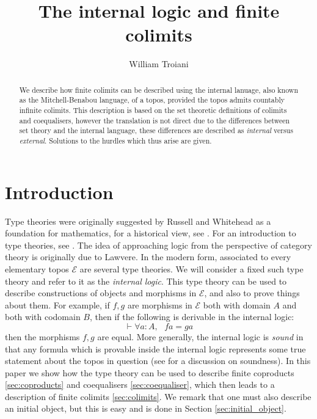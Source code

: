 \documentclass{tac}
\author{William Troiani}
\title{The internal logic and finite colimits}
\newcommand{\call}[1]{\mathcal{#1}}
\begin{document}
	
	\maketitle
	
	\begin{abstract}
		We describe how finite colimits can be described using the internal lanuage, also known as the Mitchell-Benabou language, of a topos, provided the topos admits countably infinite colimits. This description is based on the set theoretic definitions of colimits and coequalisers, however the translation is not direct due to the differences between set theory and the internal language, these differences are described as \emph{internal} versus \emph{external}. Solutions to the hurdles which thus arise are given.
	\end{abstract}
	
	
	\tableofcontents
	
	\section{Introduction}
	Type theories were originally suggested by Russell and Whitehead \cite{russell} as a foundation for mathematics, for a historical view, see \cite[p.124]{lambekscott}. For an introduction to type theories, see \cite[\S 3.3]{su}. The idea of approaching logic from the perspective of category theory is originally due to Lawvere. In the modern form, associated to every elementary topos $\call{E}$ are several type theories. We will consider a fixed such type theory and refer to it as the \emph{internal logic}. This type theory can be used to describe constructions of objects and morphisms in $\call{E}$, and also to prove things about them. For example, if $f,g$ are morphisms in $\call{E}$ both with domain $A$ and both with codomain $B$, then if the following is derivable in the internal logic:
	\begin{equation}
		\vdash \forall a:A,\text{ }fa = ga
	\end{equation}
	then the morphisms $f,g$ are equal. More generally, the internal logic is \emph{sound} in that any formula which is provable inside the internal logic represents some true statement about the topos in question (see \cite[\S D1.3.2, D4.2.3, D4.3.3, D4.4.6]{Johnstone} for a discussion on soundness). In this paper we show how the type theory can be used to describe finite coproducts \ref{sec:coproducts} and coequalisers \ref{sec:coequaliser}, which then leads to a description of finite colimits \ref{sec:colimits}. We remark that one must also describe an initial object, but this is easy and is done in Section \ref{sec:initial_object}.
	
\end{document}
